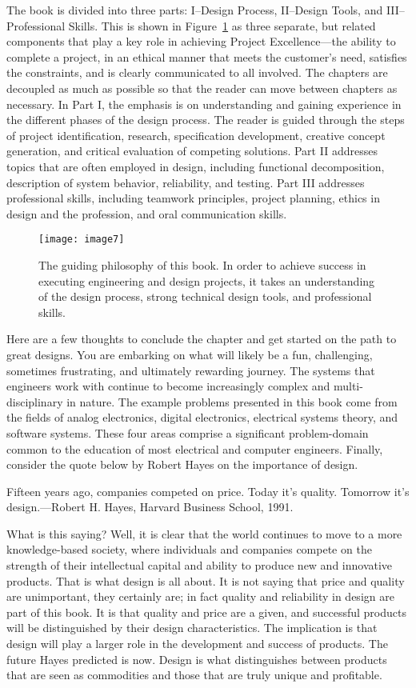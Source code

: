 The book is divided into three parts: I--Design Process, II--Design
Tools, and III--Professional Skills. This is shown in Figure~\ref{table:bookPhilosophy}
 as three separate, but related components that play a key role in achieving
Project Excellence---the ability to complete a project, in an ethical
manner that meets the customer's need, satisfies the constraints, and is
clearly communicated to all involved. The chapters are decoupled as much
as possible so that the reader can move between chapters as necessary.
In Part I, the emphasis is on understanding and gaining experience in
the different phases of the design process. The reader is guided through
the steps of project identification, research, specification
development, creative concept generation, and critical evaluation of
competing solutions. Part II addresses topics that are often employed in
design, including functional decomposition, description of system
behavior, reliability, and testing. Part III addresses professional
skills, including teamwork principles, project planning, ethics in
design and the profession, and oral communication skills.

\begin{figure}[h]
\texttt{[image: image7]}
\caption{The guiding philosophy of this book. In order to
achieve success in executing engineering and design projects, it takes
an understanding of the design process, strong technical design tools,
and professional skills.}
\label{table:bookPhilosophy}
\end{figure}


Here are a few thoughts to conclude the chapter and get started on the
path to great designs. You are embarking on what will likely be a fun,
challenging, sometimes frustrating, and ultimately rewarding journey.
The systems that engineers work with continue to become increasingly
complex and multi-disciplinary in nature. The example problems presented
in this book come from the fields of analog electronics, digital
electronics, electrical systems theory, and software systems. These four
areas comprise a significant problem-domain common to the education of
most electrical and computer engineers. Finally, consider the quote
below by Robert Hayes on the importance of design.

Fifteen years ago, companies competed on price. Today it's quality.
Tomorrow it's design.---Robert H. Hayes, Harvard Business School, 1991.

What is this saying? Well, it is clear that the world continues to move
to a more knowledge-based society, where individuals and companies
compete on the strength of their intellectual capital and ability to
produce new and innovative products. That is what design is all about.
It is not saying that price and quality are unimportant, they certainly
are; in fact quality and reliability in design are part of this book. It
is that quality and price are a given, and successful products will be
distinguished by their design characteristics. The implication is that
design will play a larger role in the development and success of
products. The future Hayes predicted is now. Design is what
distinguishes between products that are seen as commodities and those
that are truly unique and profitable.

